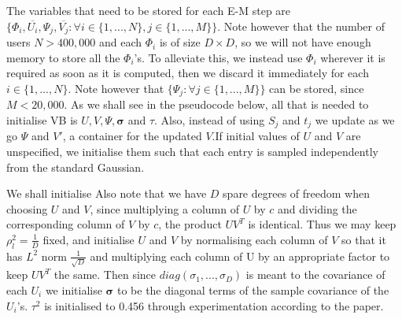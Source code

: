 \documentclass{article}
\theoremstyle{plain}
\begin{document}
The variables that need to be stored for each E-M step are $\{\Phi_i,\overline{U_i},\Psi_j,\overline{V_j} : \forall i\in \{1,...,N\},j\in \{1,...,M\}\}$. Note however that the number of users $N>400,000$ and each $\Phi_i$ is of size $D \times D$, so we will not have enough memory to store all the $\Phi_i$'s. To alleviate this, we instead use $\Phi_i$ wherever it is required as soon as it is computed, then we discard it immediately for each $i\in \{1,...,N\}$. Note however that $\{\Psi_j : \forall j\in \{1,...,M\} \}$ can be stored, since $M<20,000$. As we shall see in the pseudocode below, all that is needed to initialise VB is $U,V,\Psi,\mathbf{\sigma}$ and $\tau$. Also, instead of using $S_j$ and $t_j$ we update as we go $\Psi$ and $V'$, a container for the updated $V$.If initial values of $U$ and $V$ are unspecified, we initialise them such that each entry is sampled independently from the standard Gaussian.

We shall initialise Also note that we have $D$ spare degrees of freedom when choosing $U$ and $V$, since multiplying a column of $U$ by $c$ and dividing the corresponding column of $V$ by $c$, the product $UV^T$ is identical. Thus we may keep $\rho_l^2=\frac{1}{D}$ fixed, and initialise $U$ and $V$ by normalising each column of $V$ so that it has $L^2$ norm $\frac{1}{\sqrt{D}}$ and multiplying each column of U by an appropriate factor to keep $UV^T$ the same. Then since $diag(\sigma_1,...,\sigma_D)$ is meant to the covariance of each $U_i$ we initialise $\boldsymbol{\sigma}$ to be the diagonal terms of the sample covariance of the $U_i$'s. $\tau^2$ is initialised to 0.456 through experimentation according to the paper.
\end{document}
